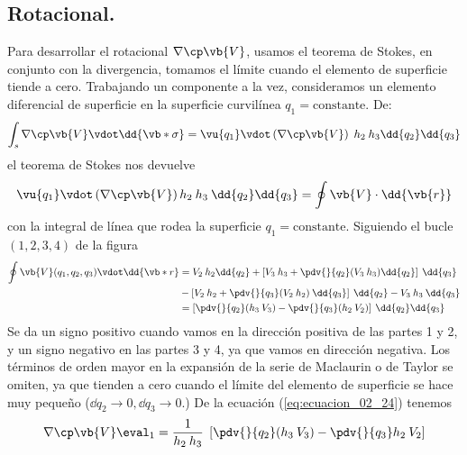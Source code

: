 \subsection{Rotacional.}
Para desarrollar el rotacional $\nabla \cp \vb{V}$, usamos el teorema de Stokes, en conjunto con la divergencia, tomamos el límite cuando el elemento de superficie tiende a cero. Trabajando un componente a la vez, consideramos un elemento diferencial de superficie en la superficie curvilínea $q_{1} = \text{constante}$. De:
\begin{equation}
\int_{s} \nabla \cp \vb{V} \vdot \dd{\vb*{\sigma}} = \vu{q_{1}} \vdot \left( \nabla \cp \vb{V} \right) \; h_{2} \: h_{3} \dd{q_{2}} \dd{q_{3}}
\label{eq:ecuacion_02_23}
\end{equation}
el teorema de Stokes nos devuelve
\begin{equation}
\vu{q_{1}} \vdot \left( \nabla \cp \vb{V} \right) h_{2} \: h_{3} \: \dd{q_{2}} \dd{q_{3}} = \oint \vb{V} \cdot \dd{\vb{r}}
\label{eq:ecuacion_02_24}
\end{equation}
con la integral de línea que rodea la superficie $q_{1}=\text{constante}$. Siguiendo el bucle $(1, 2, 3, 4)$ de la figura
\begin{align}
\begin{aligned}
\oint \vb{V} (q_{1}, q_{2}, q_{3}) \vdot \dd{\vb*{r}} &= V_{2} \: h_{2} \dd{q_{2}} + \left[ V_{3} \: h_{3} + \pdv{}{q_{2}} (V_{3} \: h_{3}) \dd{q_{2}} \right] \: \dd{q_{3}} \\
&- \left[ V_{2} \: h_{2} + \pdv{}{q_{3}} (V_{2} \: h_{2}) \: \dd{q_{3}} \right] \: \dd{q_{2}} - V_{3} \: h_{3} \: \dd{q_{3}} \\
&= \left[ \pdv{}{q_{2}} (h_{3} \: V_{3}) - \pdv{}{q_{3}} (h_{2} \: V_{2}) \right] \: \dd{q_{2}} \dd{q_{3}}
\end{aligned}
\label{eq:ecuacion_02_25}
\end{align}
Se da un signo positivo cuando vamos en la dirección positiva de las partes 1 y 2, y un signo negativo en las partes 3 y 4, ya que vamos en dirección negativa. Los términos de orden mayor en la expansión de la serie de Maclaurin o de Taylor se omiten, ya que tienden a cero cuando el límite del elemento de superficie se hace muy pequeño ($\dd{q_{2}} \rightarrow 0, \dd{q_{3}} \rightarrow 0$.)
De la ecuación (\ref{eq:ecuacion_02_24}) tenemos
\begin{equation}
\nabla \cp \vb{V} \eval_{1} = \dfrac{1}{h_{2} \:h_{3}} \; \left[ \pdv{}{q_{2}} (h_{3} \: V_{3}) - \pdv{}{q_{3}} h_{2} \: V_{2} \right]
\label{eq:ecuacion_02_26}
\end{equation}
